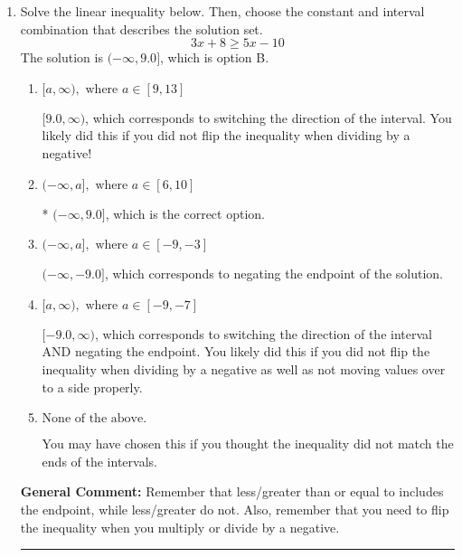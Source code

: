 \documentclass{extbook}[14pt]
\newcommand{\litem}[1]{\item #1

\rule{\textwidth}{0.4pt}}
\begin{document}
\begin{enumerate}
{\begin{enumerate}[label=\Alph*.]
$[-1.60, 3.56)$, which is the correct option.
\item \( (-\infty, a) \cup [b, \infty), \text{ where } a \in [-2.25, 1.5] \text{ and } b \in [-1.5, 6] \)

$(-\infty, -1.60) \cup [3.56, \infty)$, which corresponds to displaying the and-inequality as an or-inequality AND flipping the inequality.
\item \( (a, b], \text{ where } a \in [-2.25, -0.75] \text{ and } b \in [0, 4.5] \)

$(-1.60, 3.56]$, which corresponds to flipping the inequality.
\item \( (-\infty, a] \cup (b, \infty), \text{ where } a \in [-5.25, 0] \text{ and } b \in [1.5, 8.25] \)

$(-\infty, -1.60] \cup (3.56, \infty)$, which corresponds to displaying the and-inequality as an or-inequality.
\item \( \text{None of the above.} \)


\end{enumerate}

\textbf{General Comment:} To solve, you will need to break up the compound inequality into two inequalities. Be sure to keep track of the inequality! It may be best to draw a number line and graph your solution.
}
\litem{
Solve the linear inequality below. Then, choose the constant and interval combination that describes the solution set.
\[ 3x + 8 \geq 5x -10 \]The solution is \( (-\infty, 9.0] \), which is option B.\begin{enumerate}[label=\Alph*.]
\item \( [a, \infty), \text{ where } a \in [9, 13] \)

 $[9.0, \infty)$, which corresponds to switching the direction of the interval. You likely did this if you did not flip the inequality when dividing by a negative!
\item \( (-\infty, a], \text{ where } a \in [6, 10] \)

* $(-\infty, 9.0]$, which is the correct option.
\item \( (-\infty, a], \text{ where } a \in [-9, -3] \)

 $(-\infty, -9.0]$, which corresponds to negating the endpoint of the solution.
\item \( [a, \infty), \text{ where } a \in [-9, -7] \)

 $[-9.0, \infty)$, which corresponds to switching the direction of the interval AND negating the endpoint. You likely did this if you did not flip the inequality when dividing by a negative as well as not moving values over to a side properly.
\item \( \text{None of the above}. \)

You may have chosen this if you thought the inequality did not match the ends of the intervals.
\end{enumerate}

\textbf{General Comment:} Remember that less/greater than or equal to includes the endpoint, while less/greater do not. Also, remember that you need to flip the inequality when you multiply or divide by a negative.
}
\end{enumerate}
\end{document}
